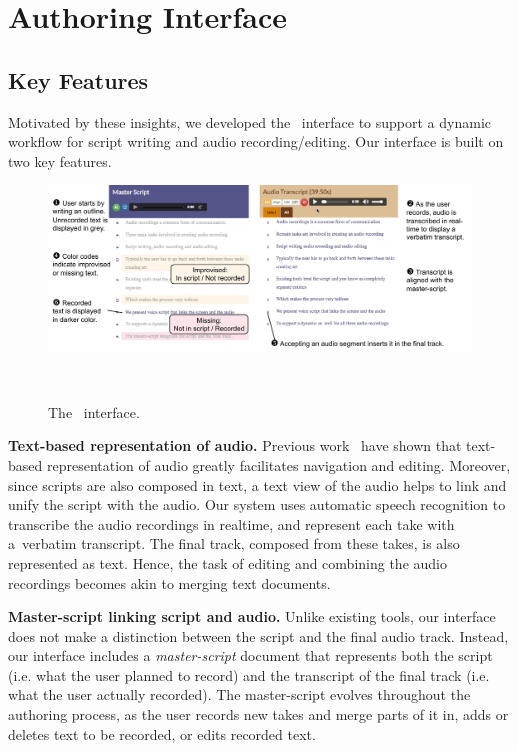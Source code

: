 \section{Authoring Interface}


\subsection{Key Features} Motivated by these insights, we developed the \systemname\  interface to support a dynamic workflow for script writing and  audio recording/editing. Our interface is built on two key features. 

\begin{figure}
  \centering
  \includegraphics[width=2.0\columnwidth]{figures/ui_aligned}
  \caption{The \systemname\ interface. }~\label{fig:ui_aligned}
\end{figure}

\textbf{Text-based representation of audio.} Previous work~\cite{casares2002simplifying,whittaker2004semantic,berthouzoz2012tools,rubin2013content} have shown that text-based representation of audio greatly facilitates navigation and editing. Moreover, since scripts are also composed in text, a text view of the audio  helps to link and unify the script
with the audio.
 Our system uses automatic speech recognition to transcribe the audio recordings in realtime, and represent each take with a\ verbatim transcript. The final track, composed from these takes, is also represented as text. Hence, the task of editing and combining the audio recordings becomes akin to merging text documents. 

\textbf{Master-script linking script and audio.} Unlike existing tools, our interface does not make a distinction between the script and the final audio track. Instead, our interface includes a \textit{master-script} document that represents both the script (i.e. what the user planned to record) and the transcript of the final track (i.e. what the user actually recorded). The master-script evolves throughout the authoring process, as the user records new takes and merge parts of it in, adds or deletes text to be recorded, or edits recorded text. 

